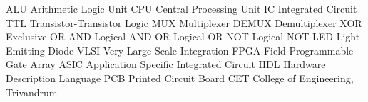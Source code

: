 
   {ALU}      {Arithmetic Logic Unit}
   {CPU}      {Central Processing Unit}
    {IC}       {Integrated Circuit}
   {TTL}      {Transistor-Transistor Logic}
   {MUX}      {Multiplexer}
 {DEMUX}    {Demultiplexer}
   {XOR}      {Exclusive OR}
   {AND}      {Logical AND}
    {OR}       {Logical OR}
   {NOT}      {Logical NOT}
   {LED}      {Light Emitting Diode}
  {VLSI}     {Very Large Scale Integration}
  {FPGA}     {Field Programmable Gate Array}
  {ASIC}     {Application Specific Integrated Circuit}
   {HDL}      {Hardware Description Language}
   {PCB}      {Printed Circuit Board}
   {CET}      {College of Engineering, Trivandrum}

